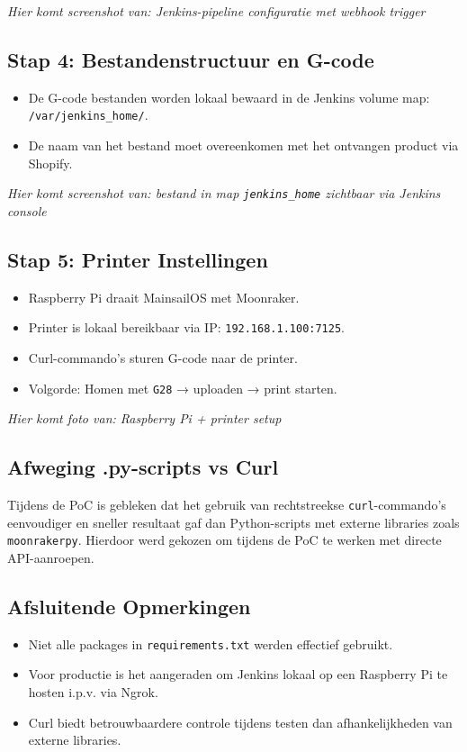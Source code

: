 \begin{enumerate}
\vspace{0.5em}
\textit{Hier komt screenshot van: Jenkins-pipeline configuratie met webhook trigger}

\subsection{Stap 4: Bestandenstructuur en G-code}
\begin{itemize}
    \item De G-code bestanden worden lokaal bewaard in de Jenkins volume map: \texttt{/var/jenkins\_home/}.
    \item De naam van het bestand moet overeenkomen met het ontvangen product via Shopify.
\end{itemize}

\vspace{0.5em}
\textit{Hier komt screenshot van: bestand in map \texttt{jenkins\_home} zichtbaar via Jenkins console}

\subsection{Stap 5: Printer Instellingen}
\begin{itemize}
    \item Raspberry Pi draait MainsailOS met Moonraker.
    \item Printer is lokaal bereikbaar via IP: \texttt{192.168.1.100:7125}.
    \item Curl-commando’s sturen G-code naar de printer.
    \item Volgorde: Homen met \texttt{G28} → uploaden → print starten.
\end{itemize}

\vspace{0.5em}
\textit{Hier komt foto van: Raspberry Pi + printer setup}

\subsection{Afweging .py-scripts vs Curl}
Tijdens de PoC is gebleken dat het gebruik van rechtstreekse \texttt{curl}-commando’s eenvoudiger en sneller resultaat gaf dan Python-scripts met externe libraries zoals \texttt{moonrakerpy}. Hierdoor werd gekozen om tijdens de PoC te werken met directe API-aanroepen.

\subsection{Afsluitende Opmerkingen}
\begin{itemize}
    \item Niet alle packages in \texttt{requirements.txt} werden effectief gebruikt.
    \item Voor productie is het aangeraden om Jenkins lokaal op een Raspberry Pi te hosten i.p.v. via Ngrok.
    \item Curl biedt betrouwbaardere controle tijdens testen dan afhankelijkheden van externe libraries.
\end{itemize}


\end{enumerate}
